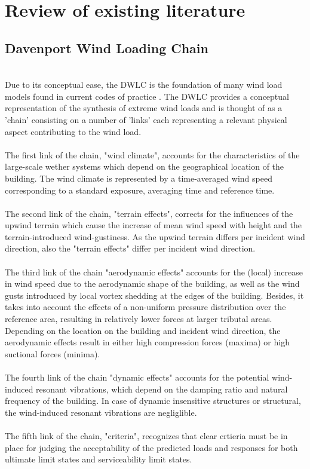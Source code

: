 \documentclass[fleqn]{article}
\begin{document}


\section{Review of existing literature} 
 

\subsection{Davenport Wind Loading Chain}
\\
Due to its conceptual ease, the DWLC is the foundation of many wind load models found in current codes of practice \cite{Davenport_2002}. The DWLC provides a conceptual representation of the synthesis of extreme wind loads and is thought of as a 'chain' consisting on a number of 'links' each representing a relevant physical aspect contributing to the wind load. \\
\\
The first link of the chain, "wind climate", accounts for the characteristics of the large-scale wether systems which depend on the geographical location of the building. The wind climate is represented by a time-averaged wind speed corresponding to a standard exposure, averaging time and reference time. \\
\\
The second link of the chain, "terrain effects", corrects for the influences of the upwind terrain which cause the increase of mean wind speed with height and the terrain-introduced wind-gustiness. As the upwind terrain differs per incident wind direction, also the "terrain effects" differ per incident wind direction.  \\
\\
The third link of the chain "aerodynamic effects" accounts for the (local) increase in wind speed due to the aerodynamic shape of the building, as well as the wind gusts introduced by local vortex shedding at the edges of the building. Besides, it takes into account the effects of a non-uniform pressure distribution over the reference area, resulting in relatively lower forces at larger tributal areas. Depending on the location on the building and incident wind direction, the aerodynamic effects result in either high compression forces (maxima) or high suctional forces (minima). \\
\\
The fourth link of the chain "dynamic effects" accounts for the potential wind-induced resonant vibrations, which depend on the damping ratio and natural frequency of the building.  
In case of dynamic insensitive structures or structural, the wind-induced resonant vibrations are negliglible. \\
\\
The fifth link of the chain, "criteria", recognizes that clear crtieria must be in place for judging the acceptability of the predicted loads and responses for both ultimate limit states and serviceability limit states. 
\end{document}
